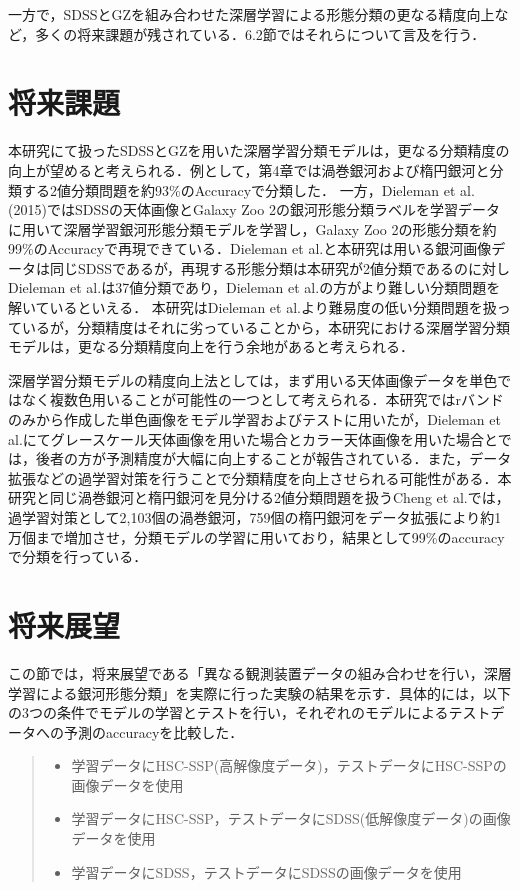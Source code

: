 \documentclass[a4j, 11pt]{jreport}
\begin{document}
一方で，SDSSとGZを組み合わせた深層学習による形態分類の更なる精度向上など，多くの将来課題が残されている．6.2節ではそれらについて言及を行う．

\section{将来課題}
本研究にて扱ったSDSSとGZを用いた深層学習分類モデルは，更なる分類精度の向上が望めると考えられる．例として，第4章では渦巻銀河および楕円銀河と分類する2値分類問題を約93\%のAccuracyで分類した．
一方，Dieleman et al.(2015)\cite{Dieleman2015}ではSDSSの天体画像とGalaxy Zoo 2の銀河形態分類ラベルを学習データに用いて深層学習銀河形態分類モデルを学習し，Galaxy Zoo 2の形態分類を約99\%のAccuracyで再現できている．Dieleman et al.と本研究は用いる銀河画像データは同じSDSSであるが，再現する形態分類は本研究が2値分類であるのに対しDieleman et al.は37値分類であり，Dieleman et al.の方がより難しい分類問題を解いているといえる．
本研究はDieleman et al.より難易度の低い分類問題を扱っているが，分類精度はそれに劣っていることから，本研究における深層学習分類モデルは，更なる分類精度向上を行う余地があると考えられる．

深層学習分類モデルの精度向上法としては，まず用いる天体画像データを単色ではなく複数色用いることが可能性の一つとして考えられる．本研究ではrバンドのみから作成した単色画像をモデル学習およびテストに用いたが，Dieleman et al.にてグレースケール天体画像を用いた場合とカラー天体画像を用いた場合とでは，後者の方が予測精度が大幅に向上することが報告されている．また，データ拡張などの過学習対策を行うことで分類精度を向上させられる可能性がある．本研究と同じ渦巻銀河と楕円銀河を見分ける2値分類問題を扱うCheng et al.では，過学習対策として2,103個の渦巻銀河，759個の楕円銀河をデータ拡張により約1万個まで増加させ，分類モデルの学習に用いており，結果として99\%のaccuracyで分類を行っている．




\section{将来展望}
この節では，将来展望である「異なる観測装置データの組み合わせを行い，深層学習による銀河形態分類」を実際に行った実験の結果を示す．具体的には，以下の3つの条件でモデルの学習とテストを行い，それぞれのモデルによるテストデータへの予測のaccuracyを比較した．

\begin{quote}
 \begin{itemize}
  \item 学習データにHSC-SSP(高解像度データ)，テストデータにHSC-SSPの画像データを使用
  \item 学習データにHSC-SSP，テストデータにSDSS(低解像度データ)の画像データを使用
  \item 学習データにSDSS，テストデータにSDSSの画像データを使用
 \end{itemize}
\end{quote}
\end{document}
